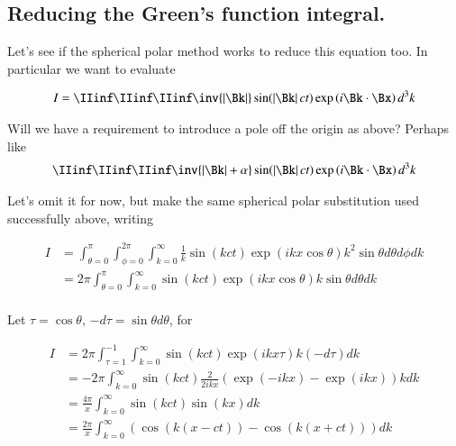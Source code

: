 \subsection{Reducing the Green's function integral. }

Let's see if the spherical polar method works to reduce this equation too.  In particular we want to evaluate

\begin{align*}
I = \IIinf \IIinf \IIinf \inv{\Abs{\Bk}} \sin( \Abs{\Bk} c t ) \exp\left( i \Bk \cdot \Bx \right) d^3 k
\end{align*}

Will we have a requirement to introduce a pole off the origin as above?  Perhaps like
\begin{align*}
\IIinf \IIinf \IIinf \inv{\Abs{\Bk} + \alpha} \sin( \Abs{\Bk} c t ) \exp\left( i \Bk \cdot \Bx \right) d^3 k
\end{align*}

Let's omit it for now, but make the same spherical polar substitution used successfully above, writing

\begin{align*}
I
&= \int_{\theta=0}^{\pi} \int_{\phi=0}^{2\pi} \int_{k=0}^\infty \frac{1}{k }
\sin\left( k c t \right) \exp\left( i k x \cos\theta \right)
k^2 \sin\theta d\theta d\phi dk \\
&= 2 \pi \int_{\theta=0}^{\pi} \int_{k=0}^\infty %
\sin\left( k c t \right) \exp\left( i k x \cos\theta \right)
k \sin\theta d\theta dk \\
\end{align*}

Let $\tau = \cos\theta$, $-d\tau = \sin\theta d\theta$, for

\begin{align*}
I
&= 2 \pi \int_{\tau=1}^{-1} \int_{k=0}^\infty %
\sin\left( k c t \right) \exp\left( i k x \tau \right)
k (-d\tau) dk \\
&= -2 \pi \int_{k=0}^\infty %
\sin\left( k c t \right)
\frac{2}{2i k x} \left( {\exp\left( -i k x \right) } -{\exp\left( i k x \right) } \right)
k dk \\
&= \frac{4 \pi }{x} \int_{k=0}^\infty %
\sin\left( k c t \right)
\sin\left( k x \right)
dk \\
&= \frac{2 \pi }{x} \int_{k=0}^\infty %
\left( \cos\left( k (x-c t) \right) -\cos\left( k (x+c t) \right) \right)
 dk \\
\end{align*}


